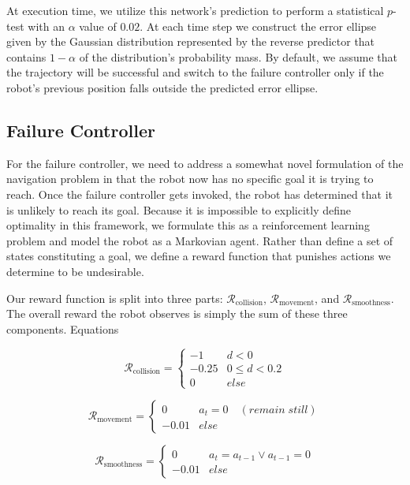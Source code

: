 \documentclass[letterpaper, 10 pt, conference]{ieeeconf}  %
\begin{document}
		At execution time, we utilize this network's prediction to perform a statistical $p$-test with an $\alpha$ value of $0.02$. At each time step we construct the error ellipse given by the Gaussian distribution represented by the reverse predictor that contains $1-\alpha$ of the distribution's probability mass. By default, we assume that the trajectory will be successful and switch to the failure controller only if the robot's previous position falls outside the predicted error ellipse.
	
	\subsection{Failure Controller}
		For the failure controller, we need to address a somewhat novel formulation of the navigation problem in that the robot now has no specific goal it is trying to reach. Once the failure controller gets invoked, the robot has determined that it is unlikely to reach its goal. Because it is impossible to explicitly define optimality in this framework, we formulate this as a reinforcement learning problem and model the robot as a Markovian agent. Rather than define a set of states constituting a goal, we define a reward function that punishes actions we determine to be undesirable. 
		
		Our reward function is split into three parts: $\mathcal{R}_{\text{collision}}$, $\mathcal{R}_{\text{movement}}$, and $\mathcal{R}_{\text{smoothness}}$. The overall reward the robot observes is simply the sum of these three components. Equations 
		
		\begin{equation}
			\mathcal{R}_{\text{collision}} = \begin{cases}
				-1      &   d < 0\\
				-0.25   &   0 \leq d < 0.2\\
				0       &   else
			\end{cases}
		\end{equation}
		
		\begin{equation}
			\mathcal{R}_{\text{movement}} = \begin{cases}
			0       &   a_t = 0 \quad(remain\;still)\\
			-0.01   &   else
			\end{cases}
		\end{equation}
		
		\begin{equation}
			\mathcal{R}_{\text{smoothness}} = \begin{cases}
			0       &   a_t = a_{t-1} \vee a_{t-1} = 0\\
			-0.01   &   else
			\end{cases}
		\end{equation}
\end{document}

